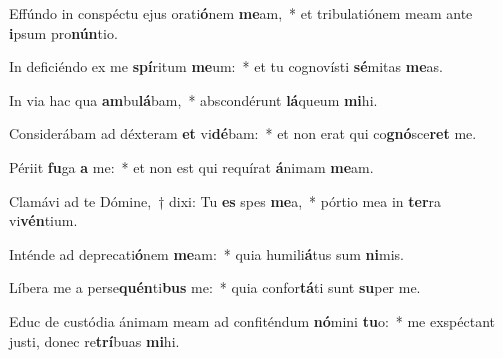 \item Effúndo in conspéctu ejus orati\textbf{ó}nem \textbf{me}am,~* et tribulatiónem meam ante \textbf{i}psum pro\textbf{nún}tio.
\item In deficiéndo ex me \textbf{spí}ritum \textbf{me}um:~* et tu cognovísti \textbf{sé}mitas \textbf{me}as.
\item In via hac qua \textbf{am}bu\textbf{lá}bam,~* abscondérunt \textbf{lá}queum \textbf{mi}hi.
\item Considerábam ad déxteram \textbf{et} vi\textbf{dé}bam:~* et non erat qui co\textbf{gnó}sce\textbf{ret} me.
\item Périit \textbf{fu}ga \textbf{a} me:~* et non est qui requírat \textbf{á}nimam \textbf{me}am.
\item Clamávi ad te Dómine,~† dixi: Tu \textbf{es} spes \textbf{me}a,~* pórtio mea in \textbf{ter}ra vi\textbf{vén}tium.
\item Inténde ad deprecati\textbf{ó}nem \textbf{me}am:~* quia humili\textbf{á}tus sum \textbf{ni}mis.
\item Líbera me a perse\textbf{quén}ti\textbf{bus} me:~* quia confor\textbf{tá}ti sunt \textbf{su}per me.
\item Educ de custódia ánimam meam ad confiténdum \textbf{nó}mini \textbf{tu}o:~* me exspéctant justi, donec re\textbf{trí}buas \textbf{mi}hi.
